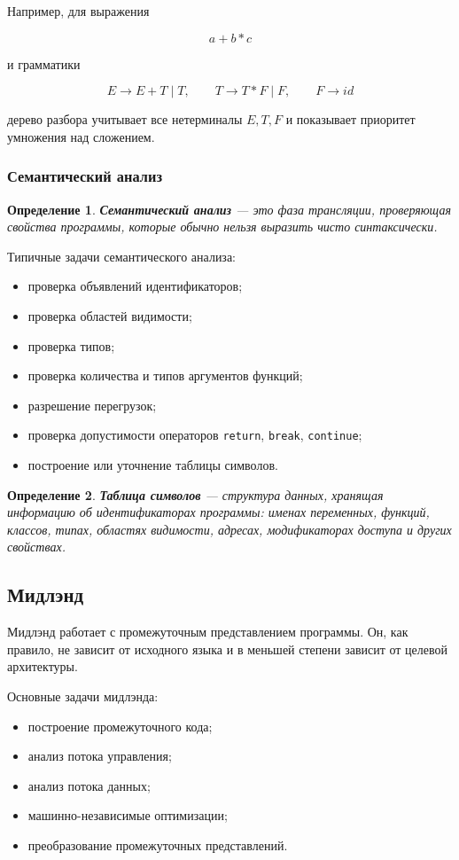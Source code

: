 \documentclass[12pt,a4paper]{article}
\newtheorem{definition}{Определение}
\begin{document}
Например, для выражения

\[
a + b * c
\]

и грамматики

\[
E \to E + T \mid T,\qquad
T \to T * F \mid F,\qquad
F \to id
\]

дерево разбора учитывает все нетерминалы $E,T,F$ и показывает приоритет умножения над сложением.

\subsubsection{Семантический анализ}

\begin{definition}
\textbf{Семантический анализ} --- это фаза трансляции, проверяющая свойства программы, которые обычно нельзя выразить чисто синтаксически.
\end{definition}

Типичные задачи семантического анализа:
\begin{itemize}
    \item проверка объявлений идентификаторов;
    \item проверка областей видимости;
    \item проверка типов;
    \item проверка количества и типов аргументов функций;
    \item разрешение перегрузок;
    \item проверка допустимости операторов \texttt{return}, \texttt{break}, \texttt{continue};
    \item построение или уточнение таблицы символов.
\end{itemize}

\begin{definition}
\textbf{Таблица символов} --- структура данных, хранящая информацию об идентификаторах программы: именах переменных, функций, классов, типах, областях видимости, адресах, модификаторах доступа и других свойствах.
\end{definition}

\subsection{Мидлэнд}

Мидлэнд работает с промежуточным представлением программы. Он, как правило, не зависит от исходного языка и в меньшей степени зависит от целевой архитектуры.

Основные задачи мидлэнда:
\begin{itemize}
    \item построение промежуточного кода;
    \item анализ потока управления;
    \item анализ потока данных;
    \item машинно-независимые оптимизации;
    \item преобразование промежуточных представлений.
\end{itemize}
\end{document}
